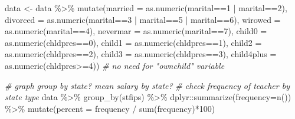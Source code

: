 \documentclass[
]{article}
\newenvironment{Shaded}{\begin{snugshade}}{\end{snugshade}}
\newcommand{\AttributeTok}[1]{\textcolor[rgb]{0.77,0.63,0.00}{#1}}
\newcommand{\CommentTok}[1]{\textcolor[rgb]{0.56,0.35,0.01}{\textit{#1}}}
\newcommand{\DecValTok}[1]{\textcolor[rgb]{0.00,0.00,0.81}{#1}}
\newcommand{\FunctionTok}[1]{\textcolor[rgb]{0.00,0.00,0.00}{#1}}
\newcommand{\NormalTok}[1]{#1}
\newcommand{\OtherTok}[1]{\textcolor[rgb]{0.56,0.35,0.01}{#1}}
\newcommand{\SpecialCharTok}[1]{\textcolor[rgb]{0.00,0.00,0.00}{#1}}
\begin{document}
\begin{Shaded}
\begin{Highlighting}[]
\NormalTok{data }\OtherTok{\textless{}{-}}\NormalTok{ data }\SpecialCharTok{\%\textgreater{}\%} \FunctionTok{mutate}\NormalTok{(}\AttributeTok{married =} \FunctionTok{as.numeric}\NormalTok{(marital}\SpecialCharTok{==}\DecValTok{1} \SpecialCharTok{|}\NormalTok{ marital}\SpecialCharTok{==}\DecValTok{2}\NormalTok{),}
                      \AttributeTok{divorced =} \FunctionTok{as.numeric}\NormalTok{(marital}\SpecialCharTok{==}\DecValTok{3} \SpecialCharTok{|}\NormalTok{ marital}\SpecialCharTok{==}\DecValTok{5} \SpecialCharTok{|}\NormalTok{ marital}\SpecialCharTok{==}\DecValTok{6}\NormalTok{),}
                      \AttributeTok{wirowed =} \FunctionTok{as.numeric}\NormalTok{(marital}\SpecialCharTok{==}\DecValTok{4}\NormalTok{),}
                      \AttributeTok{nevermar =} \FunctionTok{as.numeric}\NormalTok{(marital}\SpecialCharTok{==}\DecValTok{7}\NormalTok{),}
                      \AttributeTok{child0 =} \FunctionTok{as.numeric}\NormalTok{(chldpres}\SpecialCharTok{==}\DecValTok{0}\NormalTok{),}
                      \AttributeTok{child1 =} \FunctionTok{as.numeric}\NormalTok{(chldpres}\SpecialCharTok{==}\DecValTok{1}\NormalTok{),}
                      \AttributeTok{child2 =} \FunctionTok{as.numeric}\NormalTok{(chldpres}\SpecialCharTok{==}\DecValTok{2}\NormalTok{),}
                      \AttributeTok{child3 =} \FunctionTok{as.numeric}\NormalTok{(chldpres}\SpecialCharTok{==}\DecValTok{3}\NormalTok{),}
                      \AttributeTok{child4plus =} \FunctionTok{as.numeric}\NormalTok{(chldpres}\SpecialCharTok{\textgreater{}=}\DecValTok{4}\NormalTok{))}
\CommentTok{\# no need for "ownchild" variable  }
\end{Highlighting}
\end{Shaded}

\begin{Shaded}
\begin{Highlighting}[]
\CommentTok{\# graph group by state? mean salary by state? }
\CommentTok{\# check frequency of teacher by state type}
\NormalTok{data }\SpecialCharTok{\%\textgreater{}\%}
  \FunctionTok{group\_by}\NormalTok{(stfips) }\SpecialCharTok{\%\textgreater{}\%}
\NormalTok{  dplyr}\SpecialCharTok{::}\FunctionTok{summarize}\NormalTok{(}\AttributeTok{frequency=}\FunctionTok{n}\NormalTok{()) }\SpecialCharTok{\%\textgreater{}\%}
  \FunctionTok{mutate}\NormalTok{(}\AttributeTok{percent =}\NormalTok{ frequency }\SpecialCharTok{/} \FunctionTok{sum}\NormalTok{(frequency)}\SpecialCharTok{*}\DecValTok{100}\NormalTok{)}
\end{Highlighting}
\end{Shaded}
\end{document}
